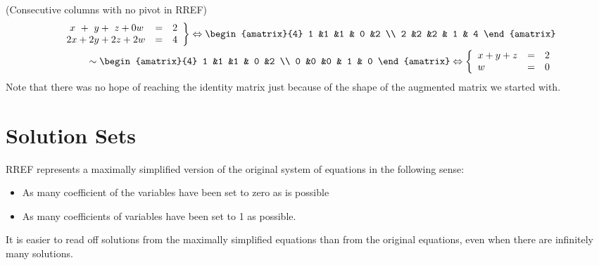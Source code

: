 \begin{example} (Consecutive  columns with no pivot in RREF)
 \begin{eqnarray*}
   \left.
\begin{array}{lcr}
	\ x \ + \ y + \ z +  0w & = & 2 \\
	2x + 2y +2z+2w & = &  4
     \end{array}
   \right\} 
   \Leftrightarrow
\begin{amatrix}{4}
1 &1 &1 & 0 &2 \\ 
2 &2 &2 & 1 & 4
\end{amatrix}
\\
\sim
\begin{amatrix}{4}
1 &1 &1 & 0 &2 \\ 
0 &0 &0 & 1 & 0
\end{amatrix}
\Leftrightarrow
\left\{
\begin{array}{lcr}
	x + y +z& = & 2 \\
	 w & = &  0
     \end{array}
   \right.
\end{eqnarray*}  
Note that there was no hope of reaching the identity matrix just because of the shape of the augmented matrix we started with. 
\end{example}





\section{Solution Sets}
RREF represents a maximally simplified version of the original system of equations in the following sense: 
\begin{itemize}
\item As many coefficient of the variables have been set to zero as is possible 
\item As many coefficients of variables have been set to 1 as possible.
\end{itemize}
It is easier to read off solutions from the maximally simplified equations than from the original equations, even when there are infinitely many solutions.

